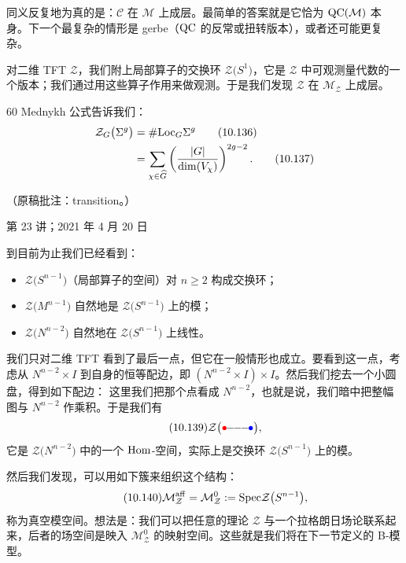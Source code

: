 同义反复地为真的是：$\mathcal{C}$ 在 $\mathcal{M}$ 上成层。最简单的答案就是它恰为 $\mathrm{QC}(\mathcal{M})$ 本身。下一个最复杂的情形是 gerbe（$\mathrm{QC}$ 的反常或扭转版本），或者还可能更复杂。

对二维 TFT $\mathcal{Z}$，我们附上局部算子的交换环 $\mathcal{Z}\big(S^1\big)$，它是 $\mathcal{Z}$ 中可观测量代数的一个版本；我们通过用这些算子作用来做观测。于是我们发现 $\mathcal{Z}$ 在 $\mathcal{M}_{\mathcal{Z}}$ 上成层。

\begin{srcrem}{60}
Mednykh 公式告诉我们：
\begin{align}
\mathcal{Z}_G\big(\Sigma^{g}\big)&=\#\mathrm{Loc}_G\Sigma^{g}\tag{10.136}\\
&=\sum_{\chi\in\widehat{G}}\left(\frac{|G|}{\dim(V_\chi)}\right)^{2g-2}.\tag{10.137}
\end{align}
\end{srcrem}

\begin{flushright}\small（原稿批注：transition。）\end{flushright}

\begin{flushright}\small 第 23 讲；2021 年 4 月 20 日\end{flushright}

到目前为止我们已经看到：
\begin{itemize}
\item $\mathcal{Z}\big(S^{n-1}\big)$（局部算子的空间）对 $n\ge2$ 构成交换环；
\item $\mathcal{Z}\big(M^{n-1}\big)$ 自然地是 $\mathcal{Z}\big(S^{n-1}\big)$ 上的模；
\item $\mathcal{Z}\big(N^{n-2}\big)$ 自然地在 $\mathcal{Z}\big(S^{n-1}\big)$ 上线性。
\end{itemize}
我们只对二维 TFT 看到了最后一点，但它在一般情形也成立。要看到这一点，考虑从 $N^{n-2}\times I$ 到自身的恒等配边，即 $(N^{n-2}\times I)\times I$。然后我们挖去一个小圆盘，得到如下配边：
这里我们把那个点看成 $N^{n-2}$，也就是说，我们暗中把整幅图与 $N^{n-2}$ 作乘积。于是我们有
\begin{equation}\tag{10.139}
\mathcal{Z}\big(\textcolor{red}{\bullet}\!\!-\!\!-\!\!-\!\!\textcolor{blue}{\bullet}\big),
\end{equation}
它是 $\mathcal{Z}\big(N^{n-2}\big)$ 中的一个 $\mathrm{Hom}$-空间，实际上是交换环 $\mathcal{Z}\big(S^{n-1}\big)$ 上的模。

然后我们发现，可以用如下簇来组织这个结构：
\begin{equation}\tag{10.140}
\mathcal{M}_{\mathcal{Z}}^{\mathrm{aff}}=\mathcal{M}_{\mathcal{Z}}^{0}:=\mathrm{Spec}\mathcal{Z}\big(S^{n-1}\big),
\end{equation}
称为真空模空间。想法是：我们可以把任意的理论 $\mathcal{Z}$ 与一个拉格朗日场论联系起来，后者的场空间是映入 $\mathcal{M}_{\mathcal{Z}}^{0}$ 的映射空间。这些就是我们将在下一节定义的 B-模型。

